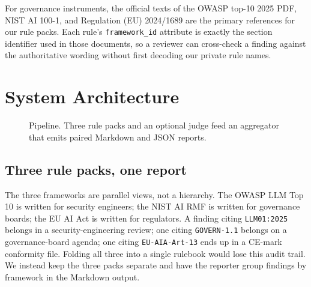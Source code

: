 \documentclass[conference]{IEEEtran}
\begin{document}
For governance instruments, the official texts of the OWASP top-10
2025 PDF, NIST AI 100-1, and Regulation (EU) 2024/1689 are the
primary references for our rule packs. Each rule's
\texttt{framework\_id} attribute is exactly the section identifier
used in those documents, so a reviewer can cross-check a finding
against the authoritative wording without first decoding our private
rule names.

\section{System Architecture}

\begin{figure}[htbp]
\centering
{}
\caption{Pipeline. Three rule packs and an optional judge feed an
aggregator that emits paired Markdown and JSON reports.}
\label{fig:pipeline}
\end{figure}

\subsection{Three rule packs, one report}
The three frameworks are parallel views, not a hierarchy. The OWASP
LLM Top 10 is written for security engineers; the NIST AI RMF is
written for governance boards; the EU AI Act is written for
regulators. A finding citing \texttt{LLM01:2025} belongs in a
security-engineering review; one citing \texttt{GOVERN-1.1} belongs
on a governance-board agenda; one citing \texttt{EU-AIA-Art-13}
ends up in a CE-mark conformity file. Folding all three into a
single rulebook would lose this audit trail. We instead keep the
three packs separate and have the reporter group findings by
framework in the Markdown output.
\end{document}
